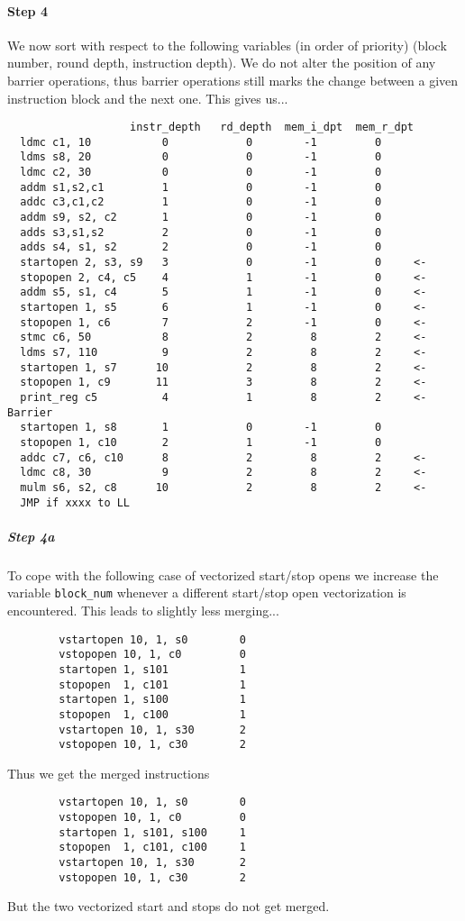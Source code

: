 \paragraph{Step 4}
We now sort with respect to the following variables (in order
of priority)
(block number, round depth, instruction depth).
We do not alter the position of any barrier operations,
thus barrier operations still marks the change between
a given instruction block and the next one.
This gives us...
\begin{verbatim}
                   instr_depth   rd_depth  mem_i_dpt  mem_r_dpt
  ldmc c1, 10           0            0        -1         0
  ldms s8, 20           0            0        -1         0
  ldmc c2, 30           0            0        -1         0
  addm s1,s2,c1         1            0        -1         0
  addc c3,c1,c2         1            0        -1         0
  addm s9, s2, c2       1            0        -1         0
  adds s3,s1,s2         2            0        -1         0
  adds s4, s1, s2       2            0        -1         0
  startopen 2, s3, s9   3            0        -1         0     <-
  stopopen 2, c4, c5    4            1        -1         0     <-
  addm s5, s1, c4       5            1        -1         0     <-
  startopen 1, s5       6            1        -1         0     <-
  stopopen 1, c6        7            2        -1         0     <-
  stmc c6, 50           8            2         8         2     <-
  ldms s7, 110          9            2         8         2     <-
  startopen 1, s7      10            2         8         2     <-
  stopopen 1, c9       11            3         8         2     <-
  print_reg c5          4            1         8         2     <- Barrier
  startopen 1, s8       1            0        -1         0
  stopopen 1, c10       2            1        -1         0
  addc c7, c6, c10      8            2         8         2     <-
  ldmc c8, 30           9            2         8         2     <-
  mulm s6, s2, c8      10            2         8         2     <-
  JMP if xxxx to LL
\end{verbatim}


\subparagraph{Step 4a}
\label{sect4a}
To cope with the following case of vectorized start/stop opens
we increase the variable \verb+block_num+ whenever a different start/stop
open vectorization is encountered. This leads to slightly
less merging...
\begin{verbatim}
        vstartopen 10, 1, s0        0
        vstopopen 10, 1, c0         0
        startopen 1, s101           1
        stopopen  1, c101           1
        startopen 1, s100           1
        stopopen  1, c100           1
        vstartopen 10, 1, s30       2
        vstopopen 10, 1, c30        2
\end{verbatim}
Thus we get the merged instructions
\begin{verbatim}
        vstartopen 10, 1, s0        0
        vstopopen 10, 1, c0         0
        startopen 1, s101, s100     1
        stopopen  1, c101, c100     1
        vstartopen 10, 1, s30       2
        vstopopen 10, 1, c30        2
\end{verbatim}
But the two vectorized start and stops do not get merged.


